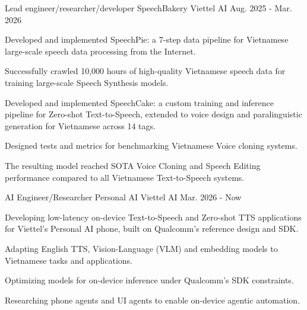 

\begin{cventries}
\cventry
    {Lead engineer/researcher/developer} %
    {SpeechBakery} %
    {Viettel AI} %
    {Aug. 2025 - Mar. 2026} %
    {
      \begin{cvitems} %
         \item Developed and implemented SpeechPie: a 7-step data pipeline for Vietnamese large-scale speech data processing from the Internet.
         \item Successfully crawled 10,000 hours of high-quality Vietnamese speech data for training large-scale Speech Synthesis models.
         \item Developed and implemented SpeechCake: a custom training and inference pipeline for Zero-shot Text-to-Speech, extended to voice design and paralinguistic generation for Vietnamese across 14 tags.
         \item Designed tests and metrics for benchmarking Vietnamese Voice cloning systems.
         \item The resulting model reached SOTA Voice Cloning and Speech Editing performance compared to all  Vietnamese Text-to-Speech systems.
      \end{cvitems}
    }

\cventry
    {AI Engineer/Researcher} %
    {Personal AI} %
    {Viettel AI} %
    {Mar. 2026 - Now} %
    {
      \begin{cvitems} %
         \item Developing low-latency on-device Text-to-Speech and Zero-shot TTS applications for Viettel's Personal AI phone, built on Qualcomm's reference design and SDK.
         \item Adapting English TTS, Vision-Language (VLM) and embedding models to Vietnamese tasks and applications.
         \item Optimizing models for on-device inference under Qualcomm's SDK constraints.
         \item Researching phone agents and UI agents to enable on-device agentic automation.
      \end{cvitems}
    }


\end{cventries}

